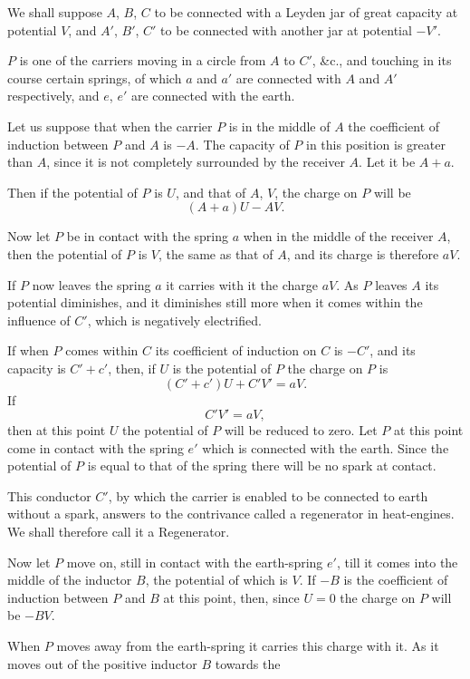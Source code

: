 \documentclass[11pt,a4paper]{article}
\begin{document}
We shall suppose $A$, $B$, $C$ to be connected with a Leyden jar
of great capacity at potential $V$, and $A'$, $B'$, $C'$ to be connected
with another jar at potential $-V'$.

$P$ is one of the carriers moving in a circle from $A$ to $C'$, \&c.,
and touching in its course certain springs, of which $a$ and $a'$ are
connected with $A$ and $A'$ respectively, and $e$, $e'$ are connected with
the earth.

Let us suppose that when the carrier $P$ is in the middle of $A$
the coefficient of induction between $P$ and $A$ is $-A$. The capacity
of $P$ in this position is greater than $A$, since it is not completely
surrounded by the receiver $A$. Let it be $A+a$.

Then if the potential of $P$ is $U$, and that of $A$, $V$, the charge
on $P$ will be
\[
(A+a)U-AV.
\]

Now let $P$ be in contact with the spring $a$ when in the middle
of the receiver $A$, then the potential of $P$ is $V$, the same as that
of $A$, and its charge is therefore $aV$.

If $P$ now leaves the spring $a$ it carries with it the charge $aV$.
As $P$ leaves $A$ its potential diminishes, and it diminishes still more
when it comes within the influence of $C'$, which is negatively
electrified.

If when $P$ comes within $C$ its coefficient of induction on $C$ is
$-C'$, and its capacity is $C'+c'$, then, if $U$ is the potential of $P$
the charge on $P$ is
\[
(C'+c')U+C'V'=aV.
\]
If
\[
C'V'=aV,
\]
then at this point $U$ the potential of $P$ will be reduced to zero.
Let $P$ at this point come in contact with the spring $e'$ which is
connected with the earth. Since the potential of $P$ is equal to that
of the spring there will be no spark at contact.

This conductor $C'$, by which the carrier is enabled to be connected
to earth without a spark, answers to the contrivance called a
regenerator in heat-engines. We shall therefore call it a Regenerator.

Now let $P$ move on, still in contact with the earth-spring $e'$, till
it comes into the middle of the inductor $B$, the potential of which
is $V$. If $-B$ is the coefficient of induction between $P$ and $B$ at
this point, then, since $U=0$ the charge on $P$ will be $-BV$.

When $P$ moves away from the earth-spring it carries this charge
with it. As it moves out of the positive inductor $B$ towards the
\end{document}
